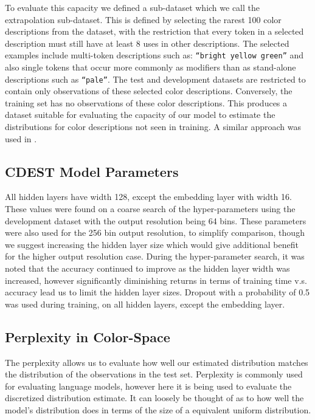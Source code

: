 \documentclass[11pt,a4paper]{article}
\newcommand{\parencite}{\citep}
\newcommand{\textcite}{\cite}
\begin{document}
To evaluate this capacity we defined a sub-dataset which we call the extrapolation sub-dataset.
This is defined by selecting the rarest 100 color descriptions from the dataset,
with the restriction that every token in a selected description must still have at least 8 uses in other descriptions.
The selected examples include multi-token descriptions such as: \texttt{``bright yellow green''} and also single tokens that occur more commonly as modifiers than as stand-alone descriptions such as \texttt{``pale''}.
The test and development datasets are restricted to contain only observations of these selected color descriptions.
Conversely, the training set has no observations of these color descriptions.
This produces a dataset suitable for evaluating the capacity of our model to estimate the distributions for color descriptions not seen in training.
A similar approach was used in \textcite{DBLP:journals/corr/AtzmonBKGC16}.

\subsection{CDEST Model Parameters}
All hidden layers have width 128, except the embedding layer with width 16.
These values were found on a coarse search of the hyper-parameters using the development dataset with the output resolution being 64 bins.
These parameters were also used for the 256 bin output resolution, to simplify comparison, though we suggest increasing the hidden layer size which would give additional benefit for the higher output resolution case.
During the hyper-parameter search, it was noted that the accuracy continued to improve as the hidden layer width was increased,
however significantly diminishing returns in terms of training time v.s. accuracy lead us to limit the hidden layer sizes.
Dropout \parencite{srivastava2014dropout} with a probability of 0.5 was used during training, on all hidden layers, except the embedding layer.

\subsection{Perplexity in Color-Space}
The perplexity allows us to evaluate how well our estimated distribution matches the distribution of the observations in the test set.
Perplexity is commonly used for evaluating language models, however here it is being used to evaluate the discretized distribution estimate.
It can loosely be thought of as to how well the model's distribution does in terms of the size of a equivalent uniform distribution.
\end{document}
